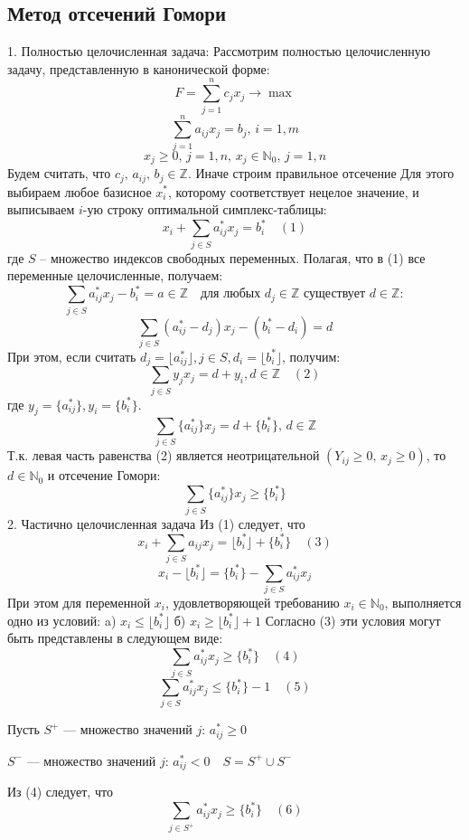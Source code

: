 \documentclass[17pt]{extarticle}
\begin{document}
\subsection{Метод отсечений Гомори}
1. Полностью целочисленная задача:
Рассмотрим полностью целочисленную задачу, представленную в канонической форме:
\[
    F = \sum_{j=1}^{n} c_j x_j \to \max
\]
\[
    \sum_{j=1}^{n} a_{ij} x_j = b_j, \, i = 1, m
\]
\[
    x_j \geq 0, \, j = 1, n, \, x_j \in \mathbb{N}_0, \, j = 1, n
\]
Будем считать, что \( c_j, \, a_{ij}, \, b_j \in \mathbb{Z} \).
Иначе строим правильное отсечение
Для этого выбираем любое базисное \( x_i^* \), которому соответствует нецелое значение, и выписываем \( i \)-ую строку оптимальной симплекс-таблицы:
\[
    x_i + \sum_{j \in S} a_{ij}^* x_j = b_i^* \quad (1)
\]
где \( S \) – множество индексов свободных переменных.
Полагая, что в (1) все переменные целочисленные, получаем:
\[
    \sum_{j \in S} a_{ij}^* x_j - b_i^* = a \in \mathbb{Z} \quad \text{для любых } d_j \in \mathbb{Z} \text{ существует } d \in \mathbb{Z}:
\]
\[
    \sum_{j \in S} (a_{ij}^* - d_j)x_j - (b_i^* - d_i) = d
\]
При этом, если считать \( d_j = \lfloor a_{ij}^* \rfloor, j \in S, d_i = \lfloor b_i^* \rfloor \), получим:
\[
    \sum_{j \in S} y_j x_j = d + y_i, d \in \mathbb{Z} \quad (2)
\]
где \( y_j = \{a_{ij}^*\}, y_i = \{b_i^*\} \).
\[
    \sum_{j \in S} \{a_{ij}^*\} x_j = d + \{b_i^*\}, \, d \in \mathbb{Z}
\]
Т.к. левая часть равенства (2) является неотрицательной
\((Y_{ij} \geq 0, \, x_j \geq 0)\), то \(d \in \mathbb{N}_0\) и
отсечение Гомори:
\[
    \sum_{j \in S} \{a_{ij}^*\} x_j \geq \{b_i^*\}
\]
2. Частично целочисленная задача
Из (1) следует, что
\[
    x_i + \sum_{j \in S} a_{ij} x_j = \lfloor b_i^* \rfloor + \{b_i^*\} \quad (3)
\]
\[
    x_i - \lfloor b_i^* \rfloor = \{b_i^*\} - \sum_{j \in S} a_{ij}^* x_j
\]
При этом для переменной \(x_i\), удовлетворяющей требованию \(x_i \in \mathbb{N}_0\), выполняется одно из условий:
a) \(x_i \leq \lfloor b_i^* \rfloor\)
б) \(x_i \geq \lfloor b_i^* \rfloor + 1\)
Согласно (3) эти условия могут быть представлены в следующем виде:
\[
    \sum_{j \in S} a_{ij}^* x_j \geq \{b_i^*\} \quad (4)
\]
\[
    \sum_{j \in S} a_{ij}^* x_j \leq \{b_i^*\} - 1 \quad (5)
\]

Пусть \( S^+ \) — множество значений \( j \): \( a_{ij}^* \geq 0 \)

\( S^- \) — множество значений \( j \): \( a_{ij}^* < 0 \quad S = S^+ \cup S^- \)

Из (4) следует, что
\[
    \sum_{j \in S^+} a_{ij}^* x_j \geq \{b_i^*\} \quad (6)
\]
\end{document}
